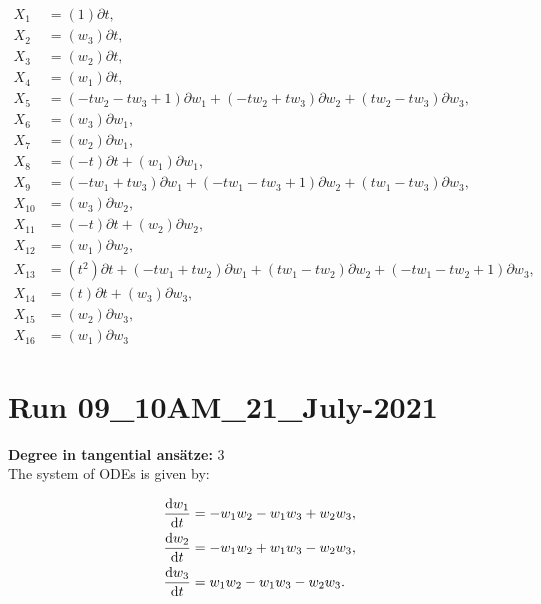 \begin{align*}
X_{1}&=\left( 1 \right)\partial t,\\
X_{2}&=\left( w_{3} \right)\partial t,\\
X_{3}&=\left( w_{2} \right)\partial t,\\
X_{4}&=\left( w_{1} \right)\partial t,\\
X_{5}&=\left( - t w_{2} - t w_{3} + 1 \right)\partial w_{1}+\left( - t w_{2} + t w_{3} \right)\partial w_{2}+\left( t w_{2} - t w_{3} \right)\partial w_{3},\\
X_{6}&=\left( w_{3} \right)\partial w_{1},\\
X_{7}&=\left( w_{2} \right)\partial w_{1},\\
X_{8}&=\left( - t \right)\partial t+\left( w_{1} \right)\partial w_{1},\\
X_{9}&=\left( - t w_{1} + t w_{3} \right)\partial w_{1}+\left( - t w_{1} - t w_{3} + 1 \right)\partial w_{2}+\left( t w_{1} - t w_{3} \right)\partial w_{3},\\
X_{10}&=\left( w_{3} \right)\partial w_{2},\\
X_{11}&=\left( - t \right)\partial t+\left( w_{2} \right)\partial w_{2},\\
X_{12}&=\left( w_{1} \right)\partial w_{2},\\
X_{13}&=\left( t^{2} \right)\partial t+\left( - t w_{1} + t w_{2} \right)\partial w_{1}+\left( t w_{1} - t w_{2} \right)\partial w_{2}+\left( - t w_{1} - t w_{2} + 1 \right)\partial w_{3},\\
X_{14}&=\left( t \right)\partial t+\left( w_{3} \right)\partial w_{3},\\
X_{15}&=\left( w_{2} \right)\partial w_{3},\\
X_{16}&=\left( w_{1} \right)\partial w_{3}\end{align*}
\section*{Run 09\_10AM\_21\_July-2021}
\textbf{Degree in tangential ansätze:}	3\\
The system of ODEs is given by:

\begin{align*}
\dv{w_{1}}{t}&=- w_{1} w_{2} - w_{1} w_{3} + w_{2} w_{3},\\
\dv{w_{2}}{t}&=- w_{1} w_{2} + w_{1} w_{3} - w_{2} w_{3},\\
\dv{w_{3}}{t}&=w_{1} w_{2} - w_{1} w_{3} - w_{2} w_{3}.\\
\end{align*}

